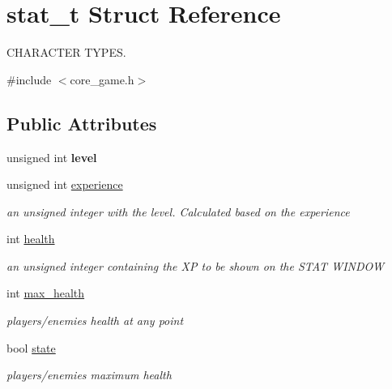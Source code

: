 \hypertarget{structstat__t}{}\section{stat\+\_\+t Struct Reference}
\label{structstat__t}


C\+H\+A\+R\+A\+C\+T\+ER T\+Y\+P\+ES.  




{\ttfamily \#include $<$core\+\_\+game.\+h$>$}

\subsection*{Public Attributes}
\begin{DoxyCompactItemize}
\item 
\mbox{\label{structstat__t_a909eba97f66f27a553775d286b92115b}} 
unsigned int {\bfseries level}
\item 
\mbox{\label{structstat__t_a6bc87ccb39290300261bbccf7aacd90f}} 
unsigned int \hyperlink{structstat__t_a6bc87ccb39290300261bbccf7aacd90f}{experience}
\begin{DoxyCompactList}\small\item\em an unsigned integer with the level. Calculated based on the experience \end{DoxyCompactList}\item 
\mbox{\label{structstat__t_aca32d64e892220cab183b3bbb0913a22}} 
int \hyperlink{structstat__t_aca32d64e892220cab183b3bbb0913a22}{health}
\begin{DoxyCompactList}\small\item\em an unsigned integer containing the XP to be shown on the S\+T\+AT W\+I\+N\+D\+OW \end{DoxyCompactList}\item 
\mbox{\label{structstat__t_aa3379f82c1c35fed5ae2c87a6a9a0524}} 
int \hyperlink{structstat__t_aa3379f82c1c35fed5ae2c87a6a9a0524}{max\+\_\+health}
\begin{DoxyCompactList}\small\item\em player\textquotesingle{}s/enemies\textquotesingle{} health at any point \end{DoxyCompactList}\item 
\mbox{\label{structstat__t_ac2b9afc65beb0829ccc6b6627769b952}} 
bool \hyperlink{structstat__t_ac2b9afc65beb0829ccc6b6627769b952}{state}
\begin{DoxyCompactList}\small\item\em player\textquotesingle{}s/enemies\textquotesingle{} maximum health \end{DoxyCompactList}\end{DoxyCompactItemize}


